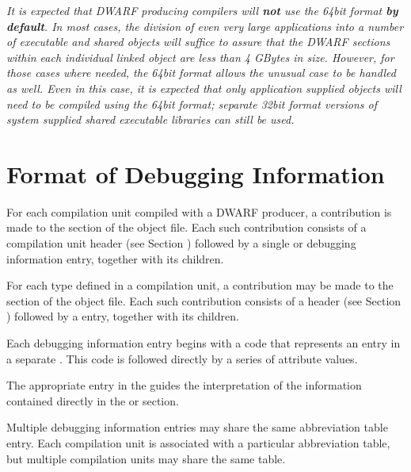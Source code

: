 \textit{It is expected that DWARF producing compilers will \textbf{not} use
the 64\dash bit format \textbf{by default}. In most cases, the division of
even very large applications into a number of executable and
shared objects will suffice to assure that the DWARF sections
within each individual linked object are less than 4 GBytes
in size. However, for those cases where needed, the 64\dash bit
format allows the unusual case to be handled as well. Even
in this case, it is expected that only application supplied
objects will need to be compiled using the 64\dash bit format;
separate 32\dash bit format versions of system supplied shared
executable libraries can still be used.}



\section{Format of Debugging Information}
\label{datarep:formatofdebugginginformation}

For each compilation unit compiled with a DWARF producer,
a contribution is made to the  section of
the object file. Each such contribution consists of a
compilation unit header 
(see Section ) 
followed by a
single  or 
 debugging
information entry, together with its children.

For each type defined in a compilation unit, a contribution may
be made to the  
section of the object file. Each
such contribution consists of a 
 header 
(see Section ) 
followed by a  entry, together with
its children.

Each debugging information entry begins with a code that
represents an entry in a separate 
. This
code is followed directly by a series of attribute values.

The appropriate entry in the 
 guides the
interpretation of the information contained directly in the
 or 
 section.

Multiple debugging information entries may share the same
abbreviation table entry. Each compilation unit is associated
with a particular abbreviation table, but multiple compilation
units may share the same table.
